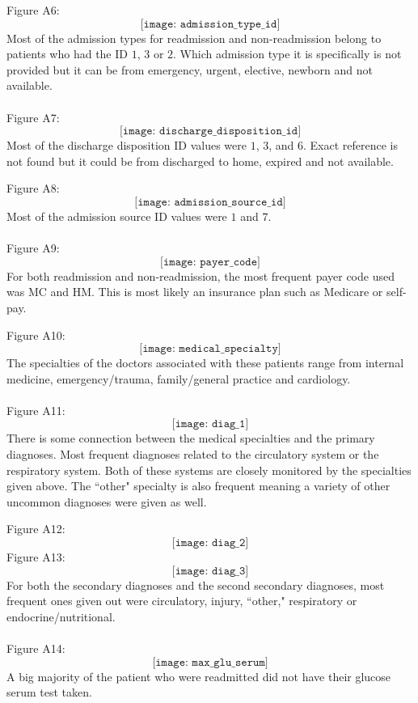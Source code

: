 \documentclass{article}
\begin{document}
Figure A6: $$ \texttt{[image: admission\_type\_id]}$$ 
Most of the admission types for readmission and non-readmission belong to patients who had the ID $1$, $3$ or $2$. Which admission type it is specifically is not provided but it can be from emergency, urgent, elective, newborn and not available. 
\\~\\
Figure A7:  $$ \texttt{[image: discharge\_disposition\_id]}$$ 
Most of the discharge disposition ID values were $1$, $3$, and $6$. Exact reference is not found but it could be from discharged to home, expired and not available. 

Figure A8: $$ \texttt{[image: admission\_source\_id]}$$ 
Most of the admission source ID values were $1$ and $7$. 
\\~\\
Figure A9: $$ \texttt{[image: payer\_code]}$$ 
For both readmission and non-readmission, the most frequent payer code used was MC and HM. This is most likely an insurance plan such as Medicare or self-pay. 


Figure A10: $$ \texttt{[image: medical\_specialty]}$$ 
The specialties of the doctors associated with these patients range from internal medicine, emergency/trauma, family/general practice and cardiology.  
\\~\\
Figure A11: $$ \texttt{[image: diag\_1]}$$ 
There is some connection between the medical specialties and the primary diagnoses. Most frequent diagnoses related to the circulatory system or the respiratory system. Both of these systems are closely monitored by the specialties given above. The ``other" specialty is also frequent meaning a variety of other uncommon diagnoses were given as well. 

Figure A12: $$ \texttt{[image: diag\_2]}$$ 
Figure A13: $$ \texttt{[image: diag\_3]}$$
For both the secondary diagnoses and the second secondary diagnoses, most frequent ones given out were circulatory, injury, ``other," respiratory or endocrine/nutritional. 
\\~\\
Figure A14: $$ \texttt{[image: max\_glu\_serum]}$$ 
A big majority of the patient who were readmitted did not have their glucose serum test taken. 
\end{document}
